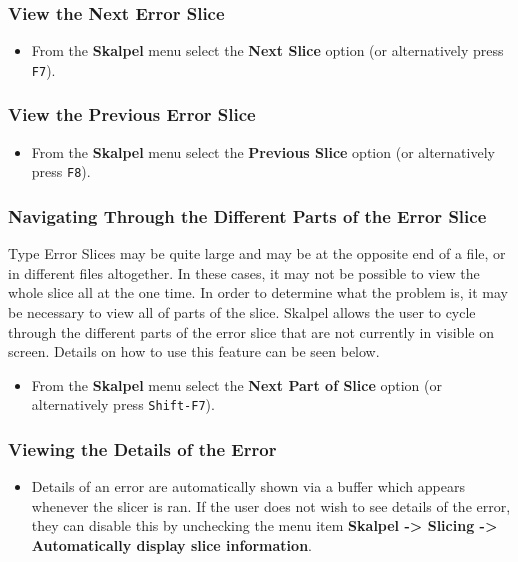 \documentclass{report}
\begin{document}
\subsubsection{View the Next Error Slice}

\begin{itemize}
\item From the \textbf{Skalpel} menu select the \textbf{Next Slice}
  option (or alternatively press \texttt{F7}).
\end{itemize}

\subsubsection{View the Previous Error Slice}

\begin{itemize}
\item From the \textbf{Skalpel} menu select the \textbf{Previous Slice}
  option (or alternatively press \texttt{F8}).
\end{itemize}

\subsubsection{Navigating Through the Different Parts of the Error Slice}
Type Error Slices may be quite large and may be at the opposite end of
a file, or in different files altogether. In these cases, it may not
be possible to view the whole slice all at the one time. In order to
determine what the problem is, it may be necessary to view all of
parts of the slice. Skalpel allows the user to cycle
through the different parts of the error slice that are not currently
in visible on screen. Details on how to use this feature can be seen below.

\begin{itemize}
\item From the \textbf{Skalpel} menu select the \textbf{Next Part of
  Slice} option (or alternatively press \texttt{Shift-F7}).
\end{itemize}

\subsubsection{Viewing the Details of the Error}

\begin{itemize}
\item Details of an error are automatically shown via a buffer which
  appears whenever the slicer is ran. If the user does not wish to see
  details of the error, they can disable this by unchecking the menu
  item \textbf{Skalpel -> Slicing -> Automatically display
    slice information}.
\end{itemize}
\end{document}
